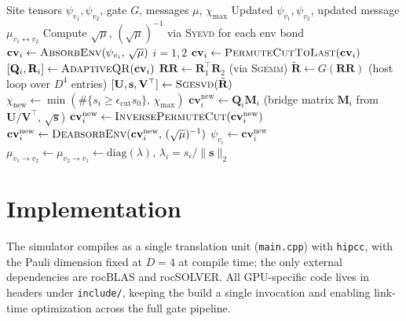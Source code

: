 \documentclass[11pt]{article}
\newcommand{\chimax}{\chi_{\mathrm{max}}}
\begin{document}
\begin{algorithm}
\caption{Gate update for bond $(v_1, v_2)$.}
\label{alg:gate}
\begin{algorithmic}[1]
\Require Site tensors $\psi_{v_1}, \psi_{v_2}$, gate $G$, messages $\mu$, $\chimax$
\Ensure Updated $\psi_{v_1}, \psi_{v_2}$, updated message $\mu_{v_1 \leftrightarrow v_2}$
\State Compute $\sqrt{\mu}$, $(\sqrt{\mu})^{-1}$ via \textsc{Syevd} for each env bond
\State $\mathbf{cv}_i \leftarrow \textsc{AbsorbEnv}(\psi_{v_i},\, \sqrt{\mu})$
       \quad $i = 1, 2$
\State $\mathbf{cv}_i \leftarrow \textsc{PermuteCutToLast}(\mathbf{cv}_i)$
\State $[\mathbf{Q}_i, \mathbf{R}_i] \leftarrow \textsc{AdaptiveQR}(\mathbf{cv}_i)$
\State $\mathbf{RR} \leftarrow \mathbf{R}_1^\top \mathbf{R}_2$
       \quad (via \textsc{Sgemm})
\State $\tilde{\mathbf{R}} \leftarrow G(\mathbf{RR})$
       \quad (host loop over $D^4$ entries)
\State $[\mathbf{U}, \mathbf{s}, \mathbf{V}^\top] \leftarrow \textsc{Sgesvd}(\tilde{\mathbf{R}})$
\State $\chi_{\text{new}} \leftarrow \min(\#\{s_i \geq \epsilon_{\text{cut}} s_0\},\, \chimax)$
\State $\mathbf{cv}_i^{\text{new}} \leftarrow \mathbf{Q}_i \mathbf{M}_i$
       \quad (bridge matrix $\mathbf{M}_i$ from $\mathbf{U}/\mathbf{V}^\top$, $\sqrt{\mathbf{s}}$)
\State $\mathbf{cv}_i^{\text{new}} \leftarrow \textsc{InversePermuteCut}(\mathbf{cv}_i^{\text{new}})$
\State $\mathbf{cv}_i^{\text{new}} \leftarrow \textsc{DeabsorbEnv}(\mathbf{cv}_i^{\text{new}},\,
       (\sqrt{\mu})^{-1})$
\State $\psi_{v_i} \leftarrow \mathbf{cv}_i^{\text{new}}$
\State $\mu_{v_1 \to v_2} \leftarrow \mu_{v_2 \to v_1}
       \leftarrow \mathrm{diag}(\lambda)$,
       \quad $\lambda_i = s_i/\|\mathbf{s}\|_2$
\end{algorithmic}
\end{algorithm}

\section{Implementation}
\label{sec:implementation}

The simulator compiles as a single translation unit (\texttt{main.cpp}) with
\texttt{hipcc}, with the Pauli dimension fixed at $D=4$ at compile time;
the only external dependencies are rocBLAS and rocSOLVER.
All GPU-specific code lives in headers under \texttt{include/}, keeping the
build a single invocation and enabling link-time optimization across the full
gate pipeline.
\end{document}
